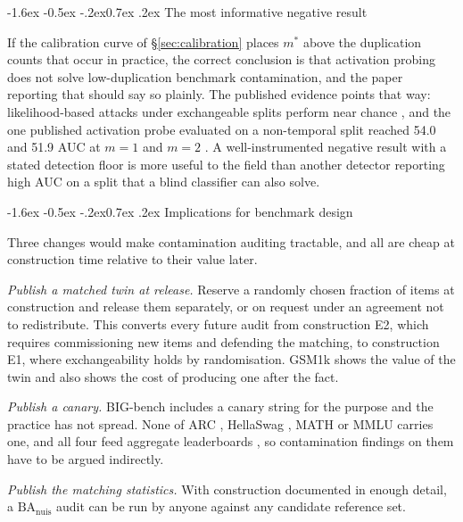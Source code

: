 \documentclass[10pt,twocolumn,letterpaper]{article}
\makeatletter
\renewcommand\subsection{\@startsection{subsection}{2}{\z@}%
  {-1.6ex \@plus -0.5ex \@minus -.2ex}{0.7ex \@plus .2ex}%
  {\normalfont\normalsize\bfseries}}
\newcommand{\BA}{\mathrm{BA}}
\newcommand{\nuis}{\mathrm{nuis}}
\makeatother
\begin{document}
\subsection{The most informative negative result}

If the calibration curve of \S\ref{sec:calibration} places $m^{*}$ above the duplication counts that occur in practice, the correct conclusion is that activation probing does not solve low-duplication benchmark contamination, and the paper reporting that should say so plainly. The published evidence points that way: likelihood-based attacks under exchangeable splits perform near chance \cite{duan2024mia}, and the one published activation probe evaluated on a non-temporal split reached 54.0 and 51.9 AUC at $m=1$ and $m=2$ \cite{liu2024probing}. A well-instrumented negative result with a stated detection floor is more useful to the field than another detector reporting high AUC on a split that a blind classifier can also solve.

\subsection{Implications for benchmark design}

Three changes would make contamination auditing tractable, and all are cheap at construction time relative to their value later.

\emph{Publish a matched twin at release.} Reserve a randomly chosen fraction of items at construction and release them separately, or on request under an agreement not to redistribute. This converts every future audit from construction E2, which requires commissioning new items and defending the matching, to construction E1, where exchangeability holds by randomisation. GSM1k \cite{zhang2024gsm1k} shows the value of the twin and also shows the cost of producing one after the fact.

\emph{Publish a canary.} BIG-bench \cite{srivastava2023bigbench} includes a canary string for the purpose and the practice has not spread. None of ARC \cite{clark2018arc}, HellaSwag \cite{zellers2019hellaswag}, MATH \cite{hendrycks2021math} or MMLU carries one, and all four feed aggregate leaderboards \cite{bommasani2023helm}, so contamination findings on them have to be argued indirectly.

\emph{Publish the matching statistics.} With construction documented in enough detail, a $\BA_{\nuis}$ audit can be run by anyone against any candidate reference set.
\end{document}
